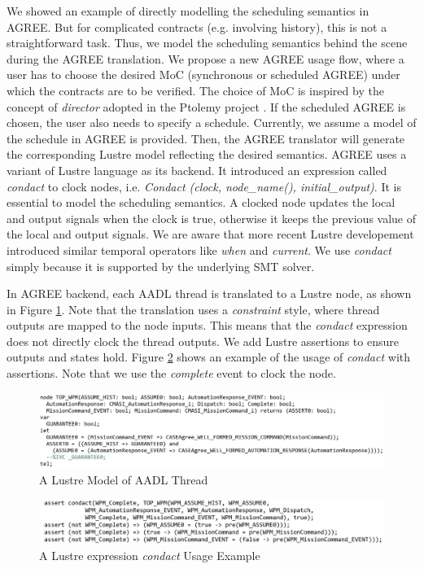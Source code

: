 We showed an example of directly modelling the scheduling semantics in AGREE. But for complicated contracts (e.g. involving history), this is not a straightforward task. Thus, we model the scheduling semantics behind the scene during the AGREE translation. We propose a new AGREE usage flow, where a user has to choose the desired MoC (synchronous or scheduled AGREE) under which the contracts are to be verified. The choice of MoC is inspired by the concept of \emph{director} adopted in the Ptolemy project \cite{Ptolemy}. If the scheduled AGREE is chosen, the user also needs to specify a schedule. Currently, we assume a model of the schedule in AGREE is provided. Then, the AGREE translator will generate the corresponding Lustre model reflecting the desired semantics. AGREE uses a variant of Lustre \cite{GAO2008111} language as its backend. It introduced an expression called \emph{condact} to clock nodes, i.e. \emph{Condact (clock, node\_name(), initial\_output)}. It is essential to model the scheduling semantics. A clocked node updates the local and output signals when the clock is true, otherwise it keeps the previous value of the local and output signals. We are aware that more recent Lustre developement introduced similar temporal operators like \emph{when} and \emph{current}. We use \emph{condact} simply because it is supported by the underlying SMT solver.

In AGREE backend, each AADL thread is translated to a Lustre node, as shown in Figure \ref{WPMlustre}. Note that the translation uses a \emph{constraint} style, where thread outputs are mapped to the node inputs. This means that the \emph{condact} expression does not directly clock the thread outputs. We add Lustre assertions to ensure outputs and states hold. Figure \ref{lustreAsync} shows an example of the usage of \emph{condact} with assertions. Note that we use the \emph{complete} event to clock the node. 

\begin{figure}[ht!]
\centering
\includegraphics[width=120mm]{wpmLustre2.jpg}
\caption{A Lustre Model of AADL Thread \label{WPMlustre}}
\end{figure}

\begin{figure}[ht!]
\centering
\includegraphics[width=120mm]{lustreAsync4.jpg}
\caption{A Lustre expression \emph{condact} Usage Example\label{lustreAsync}}
\end{figure}

